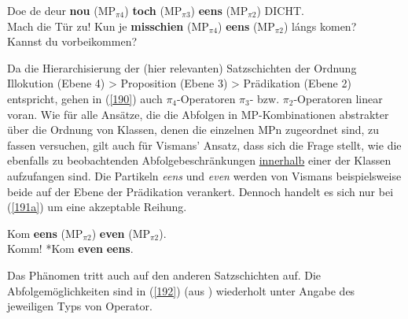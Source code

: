 \begin{exe}
	\ex\label{190} 
	\begin{xlist}	
			\ex\label{190a} 
				Doe de deur \textbf{nou} ($\textrm{MP}_{\pi4}$) \textbf{toch} ($\textrm{MP}_{\pi3}$) \textbf{eens} ($\textrm{MP}_{\pi2}$) DICHT.\\
				Mach die Tür zu!
			\ex\label{190b} 
				Kun je \textbf{misschien} ($\textrm{MP}_{\pi4}$) \textbf{eens} ($\textrm{MP}_{\pi2}$) lángs komen?\\
				Kannst du vorbeikommen?				
	\hfill\hbox{\citet[163/201]{Vismans1994}}
	\end{xlist}
\end{exe}
Da die Hierarchisierung der (hier relevanten) Satzschichten der Ordnung  Illokution (Ebene 4) > Proposition  (Ebene 3) > Prädikation  (Ebene 2) entspricht, gehen in (\ref{190}) auch $\pi_{4}$-Operatoren $\pi_{3}$- bzw. $\pi_{2}$-Operatoren linear voran. Wie für alle Ansätze, die die Abfolgen in MP-Kombinationen abstrakter über die Ordnung von Klassen, denen die einzelnen MPn zugeordnet sind, zu fassen versuchen, gilt auch für Vismans' Ansatz, dass sich die Frage stellt, wie die ebenfalls zu beobachtenden Abfolgebeschränkungen \underline{innerhalb} einer der Klassen aufzufangen sind. Die Partikeln \textit{eens} und \textit{even} werden von Vismans beispielsweise beide auf der Ebene der Prädikation  verankert. Dennoch handelt es sich nur bei (\ref{191a}) um eine akzeptable Reihung.

\begin{exe}
	\ex\label{191} 
	\begin{xlist}	
			\ex\label{191a} 
				Kom \textbf{eens} ($\textrm{MP}_{\pi2}$) \textbf{even} ($\textrm{MP}_{\pi2}$).\\
				Komm!
			\ex\label{191b} 
				*Kom \textbf{even} \textbf{eens}.			
	\hfill\hbox{\citet[163]{Vismans1994}}
	\end{xlist}
\end{exe}
Das Phänomen tritt auch auf den anderen Satzschichten auf. Die Abfolgemöglich\-keiten sind in (\ref{192}) (aus \citealt[5]{Vismans1994}) wiederholt unter Angabe des jeweiligen Typs von Operator. 

